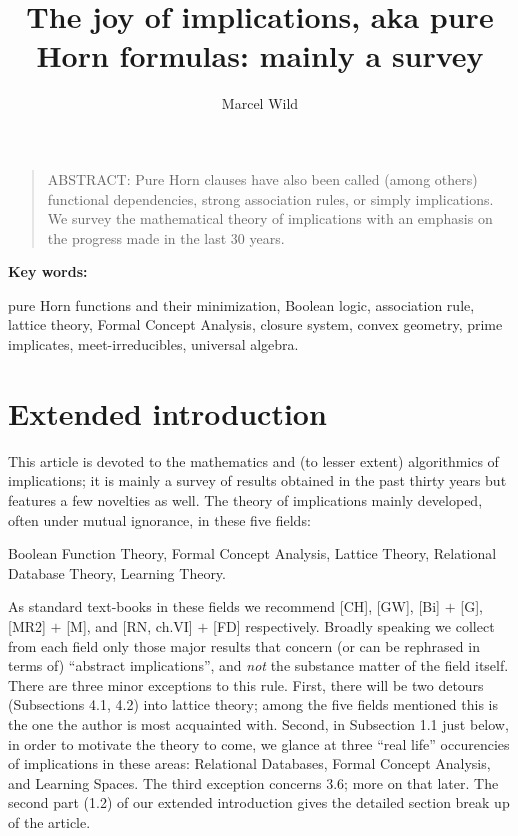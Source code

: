 \documentclass[11pt]{article}
\begin{document}
\title{The joy of implications, aka pure Horn formulas: mainly a survey}

\author{Marcel Wild}

\date{}
\maketitle


\begin{quote}
A{\scriptsize BSTRACT}: Pure Horn clauses have also been called (among others) functional dependencies, strong association rules, or simply implications. We survey the mathematical theory of implications with an emphasis on the progress made in the last 30 years.
\end{quote}

{\bf Key words:}

pure Horn functions and their minimization, Boolean logic, association rule, lattice theory, Formal Concept Analysis, closure system, convex geometry, prime implicates, meet-irreducibles, universal algebra.


\section{Extended introduction}

This article is devoted to the mathematics and (to lesser extent) algorithmics of implications; it is mainly a survey of results obtained in the past thirty years but features a few novelties as well. 
The theory of implications mainly developed, often under mutual ignorance, in these five fields:

 Boolean Function Theory, Formal Concept Analysis, Lattice Theory, Relational Database Theory, Learning Theory.

As standard text-books in these fields we recommend [CH], [GW], [Bi] $+$  [G], [MR2] $+$ [M], and [RN, ch.VI] $+$ [FD] respectively. Broadly speaking we collect from each field only those major results that concern (or can be rephrased in terms of) ``abstract implications'', and {\it not} the substance matter of the field itself. There are three minor exceptions to this rule. First, there will be two detours (Subsections 4.1, 4.2) into lattice theory; among the five fields mentioned this is the one the author is most acquainted with. Second, in Subsection 1.1 just below, in order to motivate the theory to come, we glance at three ``real life'' occurencies of implications in these areas:
Relational Databases,
Formal Concept Analysis, and Learning Spaces. The third exception concerns 3.6; more on that later.
The second part (1.2) of our extended introduction gives the detailed section break up of the article.
\end{document}
